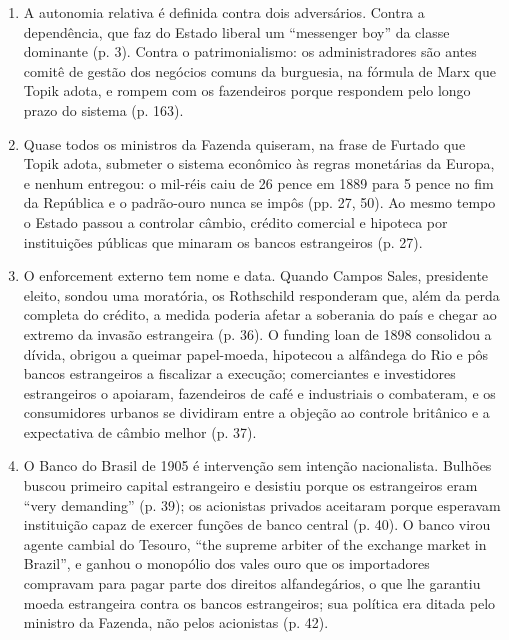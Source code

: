 \begin{enumerate}[leftmargin=*,nosep]
\item A autonomia relativa é definida contra dois adversários. Contra a
dependência, que faz do Estado liberal um ``messenger boy'' da classe dominante
(p. 3). Contra o patrimonialismo: os administradores são antes comitê de gestão
dos negócios comuns da burguesia, na fórmula de Marx que Topik adota, e rompem
com os fazendeiros porque respondem pelo longo prazo do sistema (p. 163).


\item Quase todos os ministros da Fazenda quiseram, na frase de Furtado que Topik
adota, submeter o sistema econômico às regras monetárias da Europa, e nenhum
entregou: o mil-réis caiu de 26 pence em 1889 para 5 pence no fim da República e
o padrão-ouro nunca se impôs (pp. 27, 50). Ao mesmo tempo o Estado passou a
controlar câmbio, crédito comercial e hipoteca por instituições públicas que
minaram os bancos estrangeiros (p. 27).

\item O enforcement externo tem nome e data. Quando Campos Sales, presidente
eleito, sondou uma moratória, os Rothschild responderam que, além da perda
completa do crédito, a medida poderia afetar a soberania do país e chegar ao
extremo da invasão estrangeira (p. 36). O funding loan de 1898 consolidou a
dívida, obrigou a queimar papel-moeda, hipotecou a alfândega do Rio e pôs bancos
estrangeiros a fiscalizar a execução; comerciantes e investidores estrangeiros o
apoiaram, fazendeiros de café e industriais o combateram, e os consumidores
urbanos se dividiram entre a objeção ao controle britânico e a expectativa de
câmbio melhor (p. 37).

\item O Banco do Brasil de 1905 é intervenção sem intenção nacionalista. Bulhões
buscou primeiro capital estrangeiro e desistiu porque os estrangeiros eram ``very
demanding'' (p. 39); os acionistas privados aceitaram porque esperavam
instituição capaz de exercer funções de banco central (p. 40). O banco virou
agente cambial do Tesouro, ``the supreme arbiter of the exchange market in
Brazil'', e ganhou o monopólio dos vales ouro que os importadores compravam para
pagar parte dos direitos alfandegários, o que lhe garantiu moeda estrangeira
contra os bancos estrangeiros; sua política era ditada pelo ministro da Fazenda,
não pelos acionistas (p. 42).


\end{enumerate}
